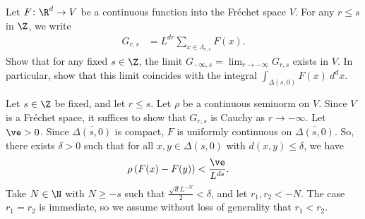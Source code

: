 \documentclass[10pt]{mypackage}
\begin{document}
\begin{problem}[Problem II.6]
  Let $F\colon \R^d\to V$ be a continuous function into the Fréchet space $V$. For any $r\leq s$ in $\Z$, we write
  \begin{align*}
    G_{r,s} &= L^{dr}\sum_{x\in \Lambda_{r,s}} F(x).
  \end{align*}
  Show that for any fixed $s\in \Z$, the limit $G_{-\infty,s} = \lim_{r\to-\infty}G_{r,s}$ exists in $V$. In particular, show that this limit coincides with the integral $ \int_{\Delta\left( s,0 \right)}^{} F(x)\:d^{d}x $.
\end{problem}
\begin{solution}
  Let $s\in \Z$ be fixed, and let $r \leq s$. Let $\rho$ be a continuous seminorm on $V$. Since $V$ is a Fréchet space, it suffices to show that $G_{r,s}$ is Cauchy as $r\to -\infty$. Let $\ve > 0$. Since $ \overline{\Delta\left( s,0 \right)} $ is compact, $F$ is uniformly continuous on $ \overline{\Delta\left( s,0 \right)} $. So, there exists $\delta > 0$ such that for all $x,y\in \overline{\Delta\left( s,0 \right)}$ with $d\left( x,y \right) \leq \delta$, we have
  \begin{align*}
    \rho\left( F(x)-F(y) \right) &< \frac{\ve}{L^{ds}}.
  \end{align*}
  Take $N\in \N$ with $N\geq -s$ such that $\frac{\sqrt{d}L^{-N}}{2} < \delta$, and let $r_1,r_2 < -N$. The case $r_1 = r_2$ is immediate, so we assume without loss of generality that $r_1 < r_2$.


\end{solution}
\end{document}
